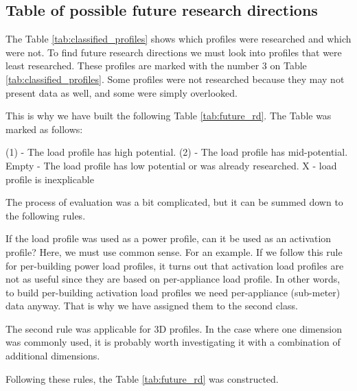 \subsection{Table of possible future research directions}

The Table \ref{tab:classified_profiles} shows which profiles were researched and which were not.
To find future research directions we must look into profiles that were least researched.
These profiles are marked with the number 3 on Table \ref{tab:classified_profiles}.
Some profiles were not researched because they may not present data as well,
and some were simply overlooked. 

This is why we have built the following Table \ref{tab:future_rd}.
The Table was marked as follows:

\begin{outline} 
\1 (1) - The load profile has high potential. 
\1 (2) - The load profile has mid-potential.
\1 Empty - The load profile has low potential or was already researched.
\1 X - load profile is inexplicable
\end{outline}

The process of evaluation was a bit complicated, but it can be summed down to the following rules.

If the load profile was used as a power profile, can it be used as an activation profile?
Here, we must use common sense.
For an example. If we follow this rule for per-building power load profiles, it 
turns out that activation load profiles are not as useful since they are based on per-appliance load profile.
In other words, to build per-building activation load profiles we need per-appliance (sub-meter) data anyway.
That is why we have assigned them to the second class.

The second rule was applicable for 3D profiles.
In the case where one dimension was commonly used, it is probably worth investigating it with a combination of additional dimensions. 

Following these rules, the Table  \ref{tab:future_rd} was constructed.


